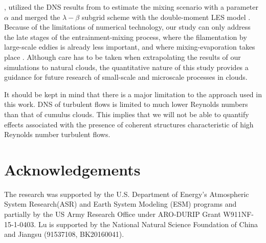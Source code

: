 \documentclass[draft,jgrga]{AGUTeX}
\begin{document}
\begin{article}
\cite{Jarecka2013}, utilized the DNS results from \citep{And04, And06, And09} to estimate the mixing scenario with a parameter $\alpha$ and merged the $\lambda-\beta$ subgrid scheme \cite{Jarecka2009} with the double-moment LES model \cite{Morrison2008}. Because of the limitations of numerical technology, our study can only address the late stages of the entrainment-mixing process, where the filamentation by large-scale eddies is already less important, and where mixing-evaporation takes place \cite{Jensen1989}. Although care has to be taken when extrapolating the results of our simulations to natural clouds, the quantitative nature of this study provides a guidance for future research of small-scale and microscale processes in clouds. 

It should be kept in mind that there is a major limitation to the approach used in this work. DNS of turbulent flows is limited to much lower Reynolds numbers than that of cumulus clouds. This implies that we will not be able to quantify effects associated with the presence of coherent structures characteristic of high Reynolds number turbulent flows.

\section{Acknowledgements}
The research was supported by the U.S. Department of Energy's Atmospheric System Research(ASR) and Earth System Modeling (ESM) programs and partially by the US Army Research Office under ARO-DURIP Grant W911NF-15-1-0403. Lu is supported by the National Natural Science Foundation of China and Jiangsu (91537108, BK20160041).



\end{article}
\end{document}
